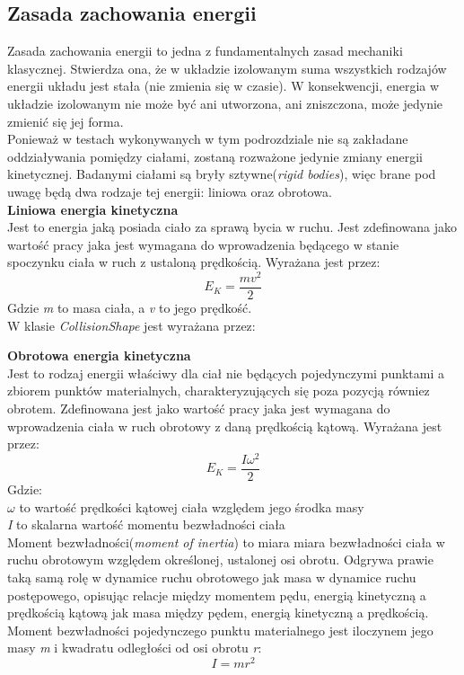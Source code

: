 \subsection{Zasada zachowania energii}
Zasada zachowania energii to jedna z fundamentalnych zasad mechaniki klasycznej.
Stwierdza ona, że w układzie izolowanym suma wszystkich rodzajów energii układu
jest stała (nie zmienia się w czasie). W konsekwencji, energia w układzie
izolowanym nie może być ani utworzona, ani zniszczona, może jedynie zmienić się
jej forma.\\
Ponieważ w testach wykonywanych w tym podrozdziale nie są zakładane
oddziaływania pomiędzy ciałami, zostaną rozważone jedynie zmiany energii
kinetycznej. Badanymi ciałami są bryły sztywne(\emph{rigid bodies}), więc brane
pod uwagę będą dwa rodzaje tej energii: liniowa oraz obrotowa.\\
\textbf{Liniowa energia kinetyczna}\\
Jest to energia jaką posiada ciało za sprawą bycia w ruchu. Jest zdefinowana
jako wartość pracy jaka jest wymagana do wprowadzenia będącego w stanie
spoczynku ciała w ruch z ustaloną prędkością. Wyrażana jest przez:
\begin{equation}
E_{K} = \frac{mv^{2}}{2}
\end{equation}
Gdzie \emph{m} to masa ciała, a \emph{v} to jego prędkość.\\
W klasie \emph{CollisionShape} jest wyrażana przez:



\textbf{Obrotowa energia kinetyczna}\\
Jest to rodzaj energii właściwy dla ciał nie będących pojedynczymi punktami a
zbiorem punktów materialnych, charakteryzujących się poza pozycją równiez
obrotem. Zdefinowana jest jako wartość pracy jaka jest wymagana do wprowadzenia
ciała w ruch obrotowy z daną prędkością kątową. Wyrażana jest przez:
\begin{equation}
E_{K} = \frac{I\omega^{2}}{2}
\end{equation}
Gdzie:\\
$ \omega $ to wartość prędkości kątowej ciała względem jego środka masy\\
\emph{I} to skalarna wartość momentu bezwładności ciała\\
Moment bezwładności(\emph{moment of inertia}) to miara miara bezwładności ciała
w ruchu obrotowym względem określonej, ustalonej osi obrotu. Odgrywa prawie taką samą
rolę w dynamice ruchu obrotowego jak masa w dynamice ruchu postępowego, opisując
relacje między momentem pędu, energią kinetyczną a prędkością kątową jak masa
między pędem, energią kinetyczną a prędkością. Moment bezwładności pojedynczego
punktu materialnego jest iloczynem jego masy \emph{m} i kwadratu odległości od
osi obrotu \emph{r}:
\begin{equation}
I = mr^{2}
\end{equation}

